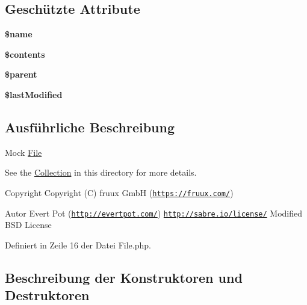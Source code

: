 \subsection*{Geschützte Attribute}
\begin{DoxyCompactItemize}
\item 
\mbox{\label{class_sabre_1_1_d_a_v_1_1_mock_1_1_file_ac42189787c7b707e1b621e6b4bc1f828}} 
{\bfseries \$name}
\item 
\mbox{\label{class_sabre_1_1_d_a_v_1_1_mock_1_1_file_a03a7a736e8c1151f605308c21db90860}} 
{\bfseries \$contents}
\item 
\mbox{\label{class_sabre_1_1_d_a_v_1_1_mock_1_1_file_a05ce21f7fae5acf22b48036d0517ed9b}} 
{\bfseries \$parent}
\item 
\mbox{\label{class_sabre_1_1_d_a_v_1_1_mock_1_1_file_a0ea5f447ca97d9a3ce29519bba22261f}} 
{\bfseries \$last\+Modified}
\end{DoxyCompactItemize}


\subsection{Ausführliche Beschreibung}
Mock \mbox{\hyperlink{class_sabre_1_1_d_a_v_1_1_mock_1_1_file}{File}}

See the \mbox{\hyperlink{class_sabre_1_1_d_a_v_1_1_mock_1_1_collection}{Collection}} in this directory for more details.

\begin{DoxyCopyright}{Copyright}
Copyright (C) fruux GmbH (\href{https://fruux.com/}{\tt https\+://fruux.\+com/}) 
\end{DoxyCopyright}
\begin{DoxyAuthor}{Autor}
Evert Pot (\href{http://evertpot.com/}{\tt http\+://evertpot.\+com/})  \href{http://sabre.io/license/}{\tt http\+://sabre.\+io/license/} Modified B\+SD License 
\end{DoxyAuthor}


Definiert in Zeile 16 der Datei File.\+php.



\subsection{Beschreibung der Konstruktoren und Destruktoren}
\mbox{\label{class_sabre_1_1_d_a_v_1_1_mock_1_1_file_add4718d9344db4d4830542605c232a7b}} 
